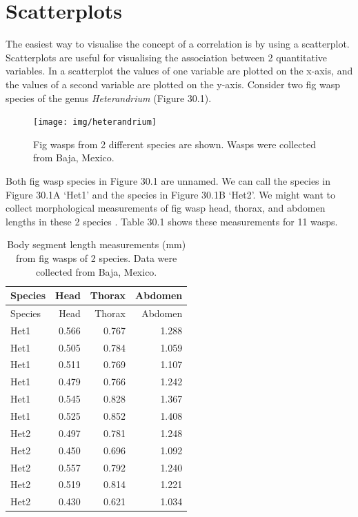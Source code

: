 \documentclass[
]{scrbook}
\begin{document}
\hypertarget{scatterplots}{%
\section{Scatterplots}\label{scatterplots}}

The easiest way to visualise the concept of a correlation is by using a scatterplot.
Scatterplots are useful for visualising the association between 2 quantitative variables.
In a scatterplot the values of one variable are plotted on the x-axis, and the values of a second variable are plotted on the y-axis.
Consider two fig wasp species of the genus \emph{Heterandrium} (Figure 30.1).

\begin{figure}
\texttt{[image: img/heterandrium]} \caption{Fig wasps from 2 different species are shown. Wasps were collected from Baja, Mexico.}\label{fig:unnamed-chunk-144}
\end{figure}

Both fig wasp species in Figure 30.1 are unnamed.
We can call the species in Figure 30.1A `Het1' and the species in Figure 30.1B `Het2'.
We might want to collect morphological measurements of fig wasp head, thorax, and abdomen lengths in these 2 species \citep{Duthie2015b}.
Table 30.1 shows these measurements for 11 wasps.

\begin{longtable}[]{@{}lrrr@{}}
\caption{\label{tab:unnamed-chunk-145}Body segment length measurements (mm) from fig wasps of 2 species. Data were collected from Baja, Mexico.}\tabularnewline
\toprule
Species & Head & Thorax & Abdomen \\
\midrule
\endfirsthead
\toprule
Species & Head & Thorax & Abdomen \\
\midrule
\endhead
Het1 & 0.566 & 0.767 & 1.288 \\
Het1 & 0.505 & 0.784 & 1.059 \\
Het1 & 0.511 & 0.769 & 1.107 \\
Het1 & 0.479 & 0.766 & 1.242 \\
Het1 & 0.545 & 0.828 & 1.367 \\
Het1 & 0.525 & 0.852 & 1.408 \\
Het2 & 0.497 & 0.781 & 1.248 \\
Het2 & 0.450 & 0.696 & 1.092 \\
Het2 & 0.557 & 0.792 & 1.240 \\
Het2 & 0.519 & 0.814 & 1.221 \\
Het2 & 0.430 & 0.621 & 1.034 \\
\bottomrule
\end{longtable}
\end{document}
